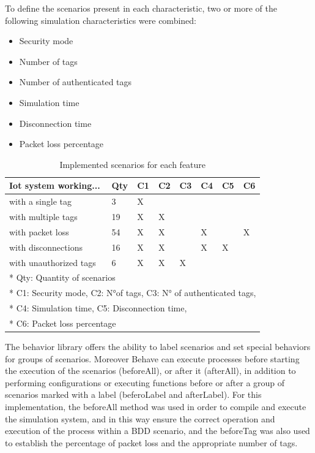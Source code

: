 \documentclass[journal]{IEEEtran}	%
\begin{document}
To define the scenarios present in each characteristic, two or more of the following simulation characteristics were combined:

\begin{itemize}
    \item Security mode
    \item Number of tags
    \item Number of authenticated tags 
    \item Simulation time
    \item Disconnection time
    \item Packet loss percentage
\end{itemize}

\begin{table}[t]
\renewcommand{\arraystretch}{1.25}		%
\centering
\caption{Implemented scenarios for each feature}	%
\label{tab:scearios}
\begin{tabular}{l|l|l|l|l|l|l|l}					%
\hline \hline
\textbf{Iot system working...}     &   \textbf{Qty}     &	\textbf{C1}     &\textbf{C2}    &\textbf{C3}    &\textbf{C4}    &\textbf{C5}    &\textbf{C6}\\
\hline
with a single tag               &   3   	            &	X   &   &   &   &   &   \\
with multiple tags              &   19  	            &	X   & X &   &   &   &   \\
with packet loss                &   54   	            &	X   & X &   & X &   & X \\
with disconnections      &   16   	            &	X   & X &   & X & X &   \\
with unauthorized tags          &   6   	            &	X   & X & X &   &   &   \\
\hline
\multicolumn{8}{l}{* Qty: Quantity of scenarios}	\\
\multicolumn{8}{l}{* C1: Security mode, C2: N°of tags, C3: N° of authenticated tags,}	\\
\multicolumn{8}{l}{* C4: Simulation time, C5: Disconnection time,}	\\
\multicolumn{8}{l}{* C6: Packet loss percentage}	\\
\hline \hline
\end{tabular}
\end{table}

The behavior library offers the ability to label scenarios and set special behaviors for groups of scenarios. Moreover Behave can execute processes before starting the execution of the scenarios (beforeAll), or after it (afterAll), in addition to performing configurations or executing functions before or after a group of scenarios marked with a label (beferoLabel and afterLabel). For this implementation, the beforeAll method was used in order to compile and execute the simulation system, and in this way ensure the correct operation and execution of the process within a BDD scenario, and the beforeTag was also used to establish the percentage of packet loss and the appropriate number of tags.
\end{document}
